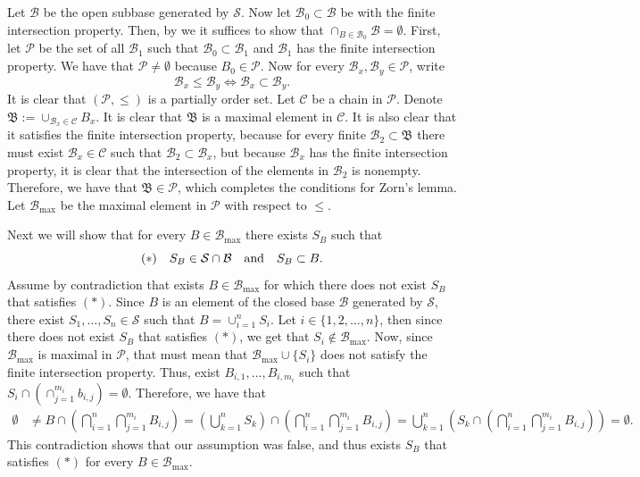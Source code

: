 \documentclass[11pt,a4paper]{article}
\begin{document}
\begin{proofof}{}
  Let $\mathcal B$ be the open subbase generated by $\mathcal S$.
  Now let $\mathcal B_0 \subset \mathcal B$ be with the finite intersection
  property. Then, by  we it suffices to
  show that $\cap_{B \in \mathcal B_0} \mathcal B = \emptyset$.
  First, let $\mathcal P$ be the set of all $\mathcal B_1$ such that
  $\mathcal B_0 \subset \mathcal B_1$ and $\mathcal B_1$ has the finite
  intersection property. We have that $\mathcal P \neq \emptyset$ because
  $B_0 \in \mathcal P$. Now for every 
  $\mathcal B_x, \mathcal B_y \in \mathcal P$, write
  \[
    \mathcal B_x \le \mathcal B_y \iff
    \mathcal B_x \subset \mathcal B_y.
  \]
  It is clear that $(\mathcal P, \le)$ is a partially order set.
  Let $\mathcal C$ be a chain in $\mathcal P$.
  Denote $\mathfrak B := \cup_{\mathcal B_x \in \mathcal C} B_x$.
  It is clear that $\mathfrak B$ is a maximal element in $\mathcal C$.
  It is also clear that it satisfies the finite intersection property,
  because for every finite $\mathcal B_2 \subset \mathfrak B$ there
  must exist $\mathcal B_x \in \mathcal C$ such that 
  $\mathcal B_2 \subset \mathcal B_x$, but because $\mathcal B_x$ has
  the finite intersection property, it is clear that the intersection
  of the elements in $\mathcal B_2$ is nonempty.
  Therefore, we have that $\mathfrak B \in \mathcal P$, which completes
  the conditions for Zorn's lemma.
  Let $\mathcal B_{\max}$ be the maximal element in $\mathcal P$ with
  respect to $\le$.

  Next we will show that for every $B \in \mathcal B_{\max}$ there exists
  $S_B$ such that
  \[
    (*) \quad S_B \in \mathcal S \cap \mathcal B \quad \text{and} \quad S_B \subset B.
  \]
  Assume by contradiction that exists $B \in \mathcal B_{\max}$ for which
  there does not exist $S_B$ that satisfies $(*)$. Since $B$ is an element
  of the closed base $\mathcal B$ generated by $\mathcal S$, there exist
  $S_1,\dots,S_n \in \mathcal S$ such that $B = \cup_{i=1}^{n} S_i$.
  Let $i \in \{1,2,\dots,n\}$, then since there does not exist $S_B$ that 
  satisfies $(*)$, we get that $S_i \notin \mathcal B_{\max}$.
  Now, since $\mathcal B_{\max}$ is maximal in $\mathcal P$, that must
  mean that $\mathcal B_{\max} \cup \{S_i\}$ does not satisfy the finite
  intersection property.
  Thus, exist $B_{i,1},\dots,B_{i,m_i}$ such that
  $S_i \cap \left(\cap_{j=1}^{m_i} b_{i,j}\right) = \emptyset$.
  Therefore, we have that
  \begin{align*}
    \emptyset 
    &\neq
    B \cap \left(\bigcap_{i=1}^{n} \bigcap_{j=1}^{m_i} B_{i,j}\right) =
    \left(\bigcup_{k=1}^{n} S_k\right) \cap
       \left(\bigcap_{i=1}^{n} \bigcap_{j=1}^{m_i} B_{i,j}\right) =
    \bigcup_{k=1}^{n} 
    \left(S_k \cap 
    \left(\bigcap_{i=1}^{n} \bigcap_{j=1}^{m_i} B_{i,j}\right)\right)
    = \emptyset.
  \end{align*}
  This contradiction shows that our assumption was false, and thus
  exists $S_B$ that satisfies $(*)$ for every $B \in \mathcal B_{\max}$.


\end{proofof}
\end{document}
